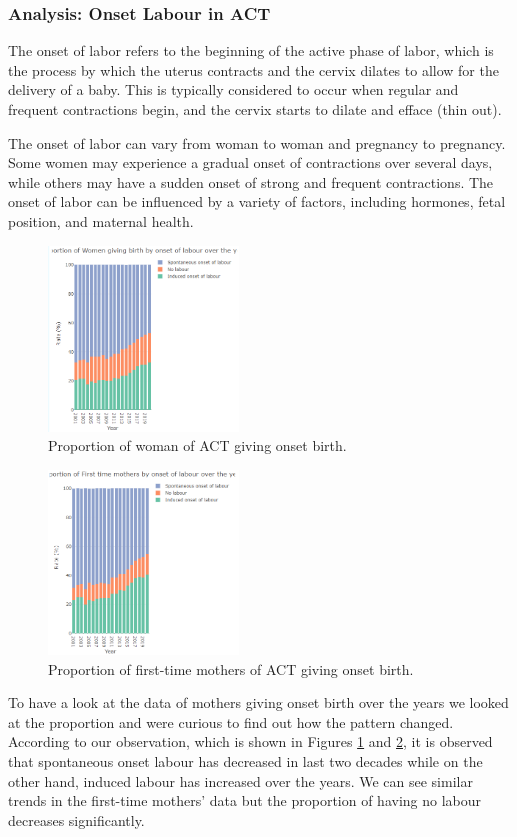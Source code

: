 \subsubsection{Analysis: Onset Labour in ACT}
The onset of labor refers to the beginning of the active phase of labor, which is the process by which the uterus contracts and the cervix dilates to allow for the delivery of a baby. This is typically considered to occur when regular and frequent contractions begin, and the cervix starts to dilate and efface (thin out)\cite{birthColum}.

The onset of labor can vary from woman to woman and pregnancy to pregnancy. Some women may experience a gradual onset of contractions over several days, while others may have a sudden onset of strong and frequent contractions. The onset of labor can be influenced by a variety of factors, including hormones, fetal position, and maternal health. 

\begin{figure}
  \centering
  \includegraphics[width=0.45\textwidth]{subsections/method_of_birth/onset_method.png}
  \caption{Proportion of woman of ACT giving onset birth.}
  \label{fig:onset}
\end{figure}

\begin{figure}
  \centering
  \includegraphics[width=0.45\textwidth]{subsections/method_of_birth/onset_method_first_time.png}
  \caption{Proportion of first-time mothers of ACT giving onset birth.}
  \label{fig:onsetFirsttime}
\end{figure}

To have a look at the data of mothers giving onset birth over the years we looked at the proportion and were curious to find out how the pattern changed. According to our observation, which is shown in Figures \ref{fig:onset} and \ref{fig:onsetFirsttime}, it is observed that spontaneous onset labour has decreased in last two decades while on the other hand, induced labour has increased over the years. We can see similar trends in the first-time mothers' data but the proportion of having no labour decreases significantly.